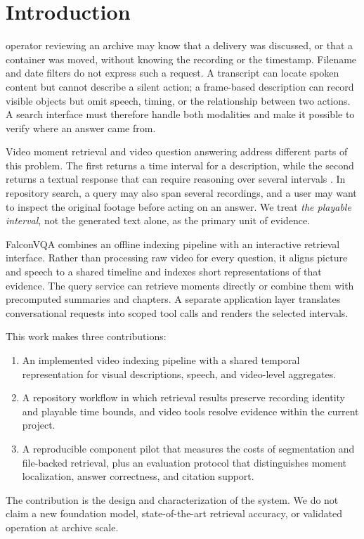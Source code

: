 \documentclass{ieeeaccess}
\begin{document}
\section{Introduction}
\label{sec:intro}
 operator reviewing an archive may know that a delivery was discussed, or that a container was moved, without knowing the recording or the timestamp. Filename and date filters do not express such a request. A transcript can locate spoken content but cannot describe a silent action; a frame-based description can record visible objects but omit speech, timing, or the relationship between two actions. A search interface must therefore handle both modalities and make it possible to verify where an answer came from.

Video moment retrieval and video question answering address different parts of this problem. The first returns a time interval for a description, while the second returns a textual response that can require reasoning over several intervals \cite{qvhighlights,nextqa,egoschema}. In repository search, a query may also span several recordings, and a user may want to inspect the original footage before acting on an answer. We treat \emph{the playable interval}, not the generated text alone, as the primary unit of evidence.

FalconVQA combines an offline indexing pipeline with an interactive retrieval interface. Rather than processing raw video for every question, it aligns picture and speech to a shared timeline and indexes short representations of that evidence. The query service can retrieve moments directly or combine them with precomputed summaries and chapters. A separate application layer translates conversational requests into scoped tool calls and renders the selected intervals.

This work makes three contributions:
\begin{enumerate}
\item An implemented video indexing pipeline with a shared temporal representation for visual descriptions, speech, and video-level aggregates.
\item A repository workflow in which retrieval results preserve recording identity and playable time bounds, and video tools resolve evidence within the current project.
\item A reproducible component pilot that measures the costs of segmentation and file-backed retrieval, plus an evaluation protocol that distinguishes moment localization, answer correctness, and citation support.
\end{enumerate}
The contribution is the design and characterization of the system. We do not claim a new foundation model, state-of-the-art retrieval accuracy, or validated operation at archive scale.
\end{document}

